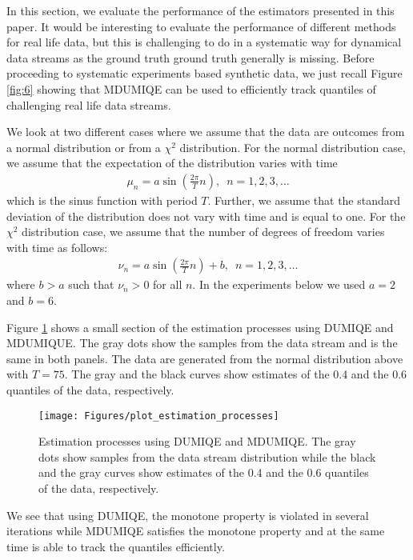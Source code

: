 \documentclass[10pt, a4paper]{article}
\newtheorem{rational for conjecture}{Rational for Conjecture}
\begin{document}
In this section, we evaluate the performance of the estimators presented in this paper.
It would be interesting to evaluate the performance of different methods for real life data, but this is challenging to do in a systematic way for dynamical data streams as the ground truth ground truth generally is missing. Before proceeding to systematic experiments based synthetic data, we just recall Figure \ref{fig:6} showing that MDUMIQE can be used to efficiently track quantiles of challenging real life data streams.

We look at two different cases where we assume that the data are outcomes from a normal distribution or from a $\chi^2$ distribution. For the normal distribution case, we assume that the expectation of the distribution varies with time
\begin{align*}
\mu_n = a \sin \left( \frac{2\pi}{T} n \right), \,\,\, n = 1,2,3, \ldots
\end{align*}
which is the sinus function with period $T$. Further, we assume that the standard deviation of the distribution does not vary with time and is equal to one. For the $\chi^2$ distribution case, we assume that the number of degrees of freedom varies with time as follows:
\begin{align*}
  \nu_n = a \sin \left( \frac{2\pi}{T} n \right) + b, \,\,\, n = 1,2,3, \ldots
\end{align*}
where $b > a$ such that $\nu_n > 0$ for all $n$. In the experiments below we used $a = 2$ and $b=6$.

Figure \ref{fig:7} shows a small section of the estimation processes using DUMIQE and MDUMIQUE. The gray dots show the samples from the data stream and is the same in both panels. The data are generated from the normal distribution above with $T=75$. The gray and the black curves show estimates of the 0.4 and the 0.6 quantiles of the data, respectively.
\begin{figure}
  \centering
  \texttt{[image: Figures/plot\_estimation\_processes]}
  \caption{Estimation processes using DUMIQE and MDUMIQE. The gray dots show samples from the data stream distribution while the black and the gray curves show estimates of the 0.4 and the 0.6 quantiles of the data, respectively.}
  \label{fig:7}
\end{figure}
We see that using DUMIQE, the monotone property is violated in several iterations while MDUMIQE satisfies the monotone property and at the same time is able to track the quantiles efficiently.
\end{document}
